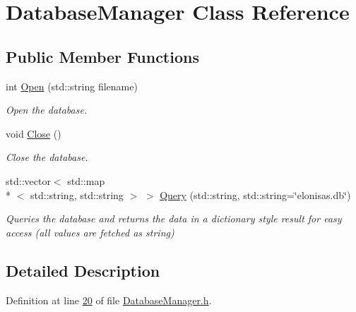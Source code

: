 \hypertarget{classDatabaseManager}{\section{Database\-Manager Class Reference}
\label{classDatabaseManager}
}
\subsection*{Public Member Functions}
\begin{DoxyCompactItemize}
\item 
int \hyperlink{classDatabaseManager_a37b1f9148ca1b698c73a98bece97cd35}{Open} (std\-::string filename)
\begin{DoxyCompactList}\small\item\em Open the database. \end{DoxyCompactList}\item 
\hypertarget{classDatabaseManager_a5232ac6d9271e2b3984042c306157bdb}{void \hyperlink{classDatabaseManager_a5232ac6d9271e2b3984042c306157bdb}{Close} ()}\label{classDatabaseManager_a5232ac6d9271e2b3984042c306157bdb}

\begin{DoxyCompactList}\small\item\em Close the database. \end{DoxyCompactList}\item 
std\-::vector$<$ std\-::map\\*
$<$ std\-::string, std\-::string $>$ $>$ \hyperlink{classDatabaseManager_adefb1bdb51d7b23d4b3a446a3f22ea26}{Query} (std\-::string, std\-::string=\char`\"{}elonisas.\-db\char`\"{})
\begin{DoxyCompactList}\small\item\em Queries the database and returns the data in a dictionary style result for easy access (all values are fetched as string) \end{DoxyCompactList}\end{DoxyCompactItemize}


\subsection{Detailed Description}


Definition at line \hyperlink{DatabaseManager_8h_source_l00020}{20} of file \hyperlink{DatabaseManager_8h_source}{Database\-Manager.\-h}.



